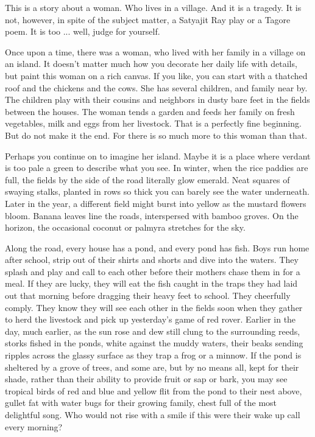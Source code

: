 \documentclass{amsart}
\begin{document}
This is a story about a woman. Who lives in a village. And it is a tragedy. It is not, however, in spite of the subject matter, a Satyajit Ray play or a Tagore poem. It is too ... well, judge for yourself.

Once upon a time, there was a woman, who lived with her family in a village on an island. It doesn't matter much how you decorate her daily life with details, but paint this woman on a rich canvas. If you like, you can start with a thatched roof and the chickens and the cows. She has several children, and family near by. The children play with their cousins and neighbors in dusty bare feet in the fields between the houses. The woman tends a garden and feeds her family on fresh vegetables, milk and eggs from her livestock. That is a perfectly fine beginning. But do not make it the end. For there is so much more to this woman than that.

Perhaps you continue on to imagine her island. Maybe it is a place where verdant is too pale a green to describe what you see. In winter, when the rice paddies are full, the fields by the side of the road literally glow emerald. Neat squares of swaying stalks, planted in rows so thick you can barely see the water underneath. Later in the year, a different field might burst into yellow as the mustard flowers bloom. Banana leaves line the roads, interspersed with bamboo groves. On the horizon, the occasional coconut or palmyra stretches for the sky. 

Along the road, every house has a pond, and every pond has fish. Boys run home after school, strip out of their shirts and shorts and dive into the waters. They splash and play and call to each other before their mothers chase them in for a meal. If they are lucky, they will eat the fish caught in the traps they had laid out that morning before dragging their heavy feet to school. They cheerfully comply. They know they will see each other in the fields soon when they gather to herd the livestock and pick up yesterday's game of red rover. Earlier in the day, much earlier, as the sun rose and dew still clung to the surrounding reeds, storks fished in the ponds, white against the muddy waters, their beaks sending ripples across the glassy surface as they trap a frog or a minnow. If the pond is sheltered by a grove of trees, and some are, but by no means all, kept for their shade, rather than their ability to provide fruit or sap or bark, you may see tropical birds of red and blue and yellow flit from the pond to their nest above, gullet fat with water bugs for their growing family, chest full of the most delightful song. Who would not rise with a smile if this were their wake up call every morning?
\end{document}
